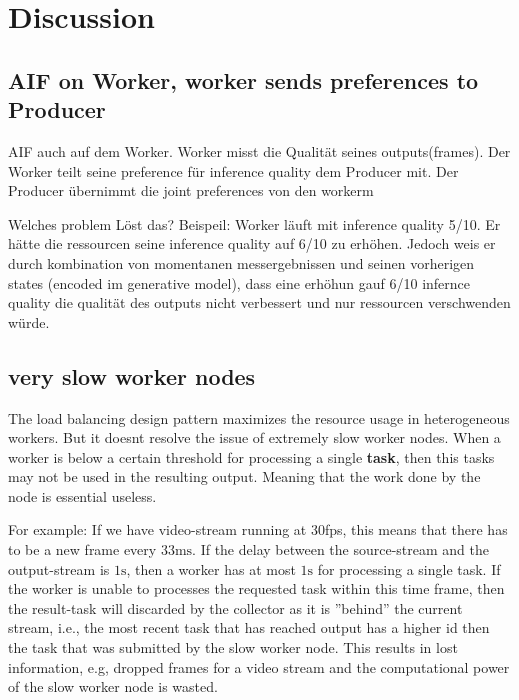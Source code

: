\chapter{Discussion}
\section{AIF on Worker, worker sends preferences to Producer}
AIF auch auf dem Worker. Worker misst die Qualität seines outputs(frames). 
Der Worker teilt seine preference für inference quality dem Producer mit. 
Der Producer übernimmt die joint preferences von den workerm

Welches problem Löst das? Beispeil:
Worker läuft mit inference quality  5/10. Er hätte die ressourcen seine inference quality auf 6/10 zu erhöhen.
Jedoch weis er durch kombination von momentanen messergebnissen und seinen vorherigen states (encoded im generative model), dass eine erhöhun gauf 6/10 infernce quality die qualität des outputs nicht verbessert und nur ressourcen verschwenden würde.

\section{very slow worker nodes}
The load balancing design pattern maximizes the resource usage in heterogeneous workers. But it doesnt resolve the issue of extremely slow worker nodes. When a worker is below a certain threshold for processing a single \textbf{task}, then this tasks may not be used in the resulting output. Meaning that the work done by the node is essential useless.

For example:
If we have video-stream running at 30fps, this means that there has to be a new frame every \(33\text{ms}\). If the delay between the source-stream and the output-stream is \(1\text{s}\), then a worker has at most \(1\text{s}\) for processing a single task. If the worker is unable to processes the requested task within this time frame, then the result-task will discarded by the collector as it is ''behind'' the current stream, i.e., the most recent task that has reached output has a higher id then the task that was submitted by the slow worker node. This results in lost information, e.g, dropped frames for a video stream and the computational power of the slow worker node is wasted.